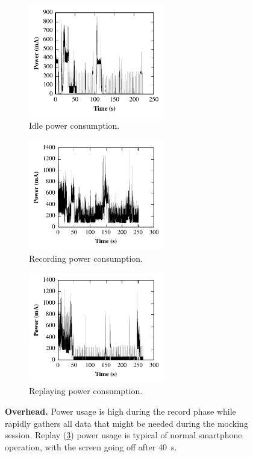 \begin{figure}[t]

\begin{subfigure}[t]{2.33in}
\includegraphics[width=2.33in]{./figures/overhead/idle.pdf}
\caption{Idle power consumption.}
\label{fig-overhead-idle}
\end{subfigure}%
\begin{subfigure}[t]{2.33in}
\includegraphics[width=2.33in]{./figures/overhead/recording.pdf}
\caption{Recording power consumption.}
\label{fig-overhead-recording}
\end{subfigure}%
\begin{subfigure}[t]{2.33in}
\includegraphics[width=2.33in]{./figures/overhead/replaying.pdf}
\caption{Replaying power consumption.}
\label{fig-overhead-replaying}
\end{subfigure}

\caption{\textbf{\PocketMocker{} Overhead.} Power usage is high during the
record phase while \PocketMocker{} rapidly gathers all data that might be
needed during the mocking session. Replay (\ref{fig-overhead-replaying})
power usage is typical of normal smartphone operation, with the screen going
off after 40~s.}

\label{fig-overhead}

\end{figure}

